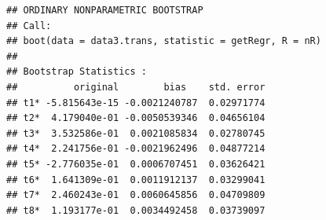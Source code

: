 \documentclass[]{article}
\newenvironment{Shaded}{\begin{snugshade}}{\end{snugshade}}
\newcommand{\KeywordTok}[1]{\textcolor[rgb]{0.13,0.29,0.53}{\textbf{#1}}}
\newcommand{\DataTypeTok}[1]{\textcolor[rgb]{0.13,0.29,0.53}{#1}}
\newcommand{\DecValTok}[1]{\textcolor[rgb]{0.00,0.00,0.81}{#1}}
\newcommand{\StringTok}[1]{\textcolor[rgb]{0.31,0.60,0.02}{#1}}
\newcommand{\ControlFlowTok}[1]{\textcolor[rgb]{0.13,0.29,0.53}{\textbf{#1}}}
\newcommand{\OperatorTok}[1]{\textcolor[rgb]{0.81,0.36,0.00}{\textbf{#1}}}
\newcommand{\NormalTok}[1]{#1}
\begin{document}
\begin{Shaded}
\end{Shaded}

\begin{verbatim}
## ORDINARY NONPARAMETRIC BOOTSTRAP
## Call:
## boot(data = data3.trans, statistic = getRegr, R = nR)
## 
## Bootstrap Statistics :
##          original        bias    std. error
## t1* -5.815643e-15 -0.0021240787  0.02971774
## t2*  4.179040e-01 -0.0050539346  0.04656104
## t3*  3.532586e-01  0.0021085834  0.02780745
## t4*  2.241756e-01 -0.0021962496  0.04877214
## t5* -2.776035e-01  0.0006707451  0.03626421
## t6*  1.641309e-01  0.0011912137  0.03299041
## t7*  2.460243e-01  0.0060645856  0.04709809
## t8*  1.193177e-01  0.0034492458  0.03739097
\end{verbatim}
\end{document}
